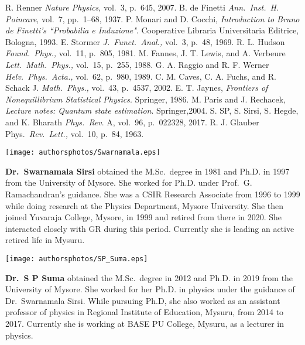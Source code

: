 \begin{thebibliography}{99}
 R. Renner \textit{Nature Physics}, vol.\ 3, p.\ 645, 2007.
 B. de Finetti \textit{Ann.\ Inst.\ H. Poincare}, vol.\ 7, pp.\ 1--68, 1937.
 P. Monari and D. Cocchi, \textit{Introduction to Bruno de Finetti's ``Probabilia e Induzione"}. Cooperative Libraria Universitaria Editrice, Bologna, 1993.
 E. Stormer \textit{J.\ Funct.\ Anal.,} vol.\ 3, p.\ 48, 1969.
 R. L. Hudson \textit{Found.\ Phys.,} vol.\ 11, p.\ 805, 1981.
 M. Fannes, J. T. Lewis, and A. Verbeure \textit{Lett.\ Math.\ Phys.,} vol.\ 15, p.\ 255, 1988.
 G. A. Raggio and R. F. Werner \textit{Helv.\ Phys.\ Acta.,} vol.\ 62, p.\ 980, 1989.
 C. M. Caves, C. A. Fuchs, and R. Schack J. \textit{Math.\ Phys.,} vol.\ 43, p.\ 4537, 2002.
 E. T. Jaynes, \textit{Frontiers of Nonequillibrium Statistical Physics}. Springer, 1986.
 M. Paris and J. Rechacek, \textit{Lecture notes: Quantum state estimation}. Springer,2004.
 S. SP, S. Sirsi, S. Hegde, and K. Bharath \textit{Phys.\ Rev}. A, vol.\ 96, p.\ 022328, 2017.
 R. J. Glauber Phys.\ \textit{Rev.\ Lett.,} vol.\ 10, p.\ 84, 1963.
\end{thebibliography}
\newpage

\centerline{\texttt{[image: authorsphotos/Swarnamala.eps]}}
\bigskip

\noindent
\textbf{Dr.\ Swarnamala Sirsi} obtained the M.Sc.\ degree in 1981 and Ph.D. in 1997 from the University of Mysore. She worked for Ph.D. under Prof.\ G. Ramachandran’s guidance. She was a CSIR Research Associate from 1996 to 1999 while doing research at the Physics Department, Mysore University. She then joined Yuvaraja College, Mysore, in 1999 and retired from there in 2020. She interacted closely with GR during this period. Currently she is leading an active retired life in Mysuru.
\vskip 1cm

\centerline{\texttt{[image: authorsphotos/SP\_Suma.eps]}}
\bigskip

\noindent
\textbf{Dr.\ S P Suma} obtained the M.Sc.\ degree in 2012 and Ph.D. in 2019 from the University of Mysore. She worked for her Ph.D.  in physics under the guidance of Dr.\ Swarnamala Sirsi.  While pursuing Ph.D, she also worked as an assistant professor of physics in Regional Institute of Education, Mysuru, from 2014 to 2017. Currently she is working at BASE PU College, Mysuru, as a lecturer in physics.
